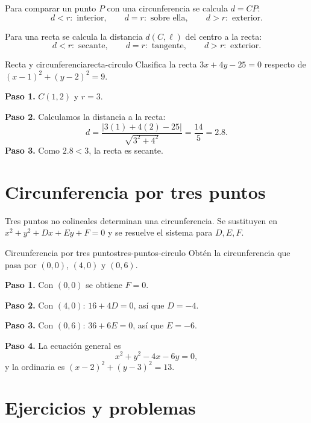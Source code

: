 Para comparar un punto $P$ con una circunferencia se calcula $d=CP$:
\[
d<r:\text{ interior},\qquad d=r:\text{ sobre ella},\qquad d>r:\text{ exterior}.
\]

Para una recta se calcula la distancia $d(C,\ell)$ del centro a la recta:
\[
d<r:\text{ secante},\qquad d=r:\text{ tangente},\qquad d>r:\text{ exterior}.
\]

\begin{example}{Recta y circunferencia}{recta-circulo}
Clasifica la recta $3x+4y-25=0$ respecto de
$(x-1)^2+(y-2)^2=9$.
\begin{solution}
\textbf{Paso 1.} $C(1,2)$ y $r=3$.

\textbf{Paso 2.} Calculamos la distancia a la recta:
\[
d=\frac{|3(1)+4(2)-25|}{\sqrt{3^2+4^2}}=\frac{14}{5}=2.8.
\]
\textbf{Paso 3.} Como $2.8<3$, la recta es secante.
\end{solution}
\end{example}

\section{Circunferencia por tres puntos}

Tres puntos no colineales determinan una circunferencia. Se sustituyen en
$x^2+y^2+Dx+Ey+F=0$ y se resuelve el sistema para $D,E,F$.

\begin{example}{Circunferencia por tres puntos}{tres-puntos-circulo}
Obtén la circunferencia que pasa por $(0,0)$, $(4,0)$ y $(0,6)$.
\begin{solution}
\textbf{Paso 1.} Con $(0,0)$ se obtiene $F=0$.

\textbf{Paso 2.} Con $(4,0)$: $16+4D=0$, así que $D=-4$.

\textbf{Paso 3.} Con $(0,6)$: $36+6E=0$, así que $E=-6$.

\textbf{Paso 4.} La ecuación general es
\[
x^2+y^2-4x-6y=0,
\]
y la ordinaria es $(x-2)^2+(y-3)^2=13$.
\end{solution}
\end{example}

\section{Ejercicios y problemas}

